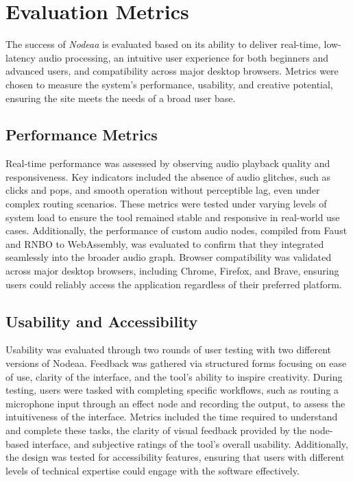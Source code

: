 \documentclass[10pt,twocolumn]{article}
\begin{document}
\section{Evaluation Metrics}

The success of \textit{Nodeaa} is evaluated based on its ability to deliver real-time, low-latency audio processing, an intuitive user experience for both beginners and advanced users, and compatibility across major desktop browsers. Metrics were chosen to measure the system’s performance, usability, and creative potential, ensuring the site meets the needs of a broad user base.

\subsection{Performance Metrics}
Real-time performance was assessed by observing audio playback quality and responsiveness. Key indicators included the absence of audio glitches, such as clicks and pops, and smooth operation without perceptible lag, even under complex routing scenarios. These metrics were tested under varying levels of system load to ensure the tool remained stable and responsive in real-world use cases. Additionally, the performance of custom audio nodes, compiled from Faust and RNBO to WebAssembly, was evaluated to confirm that they integrated seamlessly into the broader audio graph. Browser compatibility was validated across major desktop browsers, including Chrome, Firefox, and Brave, ensuring users could reliably access the application regardless of their preferred platform.

\subsection{Usability and Accessibility}
Usability was evaluated through two rounds of user testing with two different versions of Nodeaa. Feedback was gathered via structured forms focusing on ease of use, clarity of the interface, and the tool’s ability to inspire creativity. During testing, users were tasked with completing specific workflows, such as routing a microphone input through an effect node and recording the output, to assess the intuitiveness of the interface. Metrics included the time required to understand and complete these tasks, the clarity of visual feedback provided by the node-based interface, and subjective ratings of the tool’s overall usability. Additionally, the design was tested for accessibility features, ensuring that users with different levels of technical expertise could engage with the software effectively.
\end{document}
